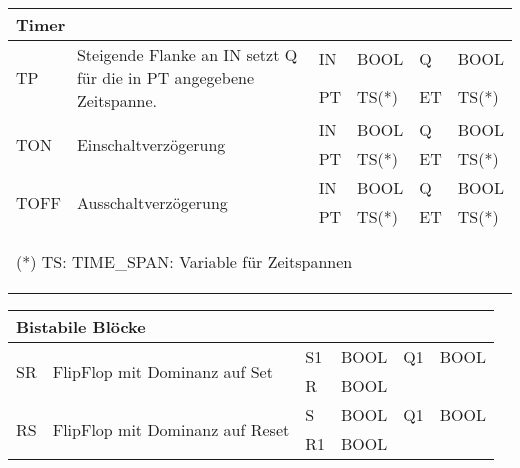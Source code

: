 {\begin{table}
\begin{tabular}{|m{2cm}|m{7cm}|>{\raggedright}m{0.75cm} >{\raggedleft}m{1cm}|>{\raggedright}m{0.75cm} >{\raggedleft\arraybackslash}m{1cm}|}
\multicolumn{6}{|l|}{\textbf{Timer}}\\
\hline
\multirow{2}{*}{TP}&\multirow{2}{7cm}{Steigende Flanke an IN setzt Q für die in PT angegebene Zeitspanne.}& IN & BOOL & Q & BOOL\\
 & &PT & TS(*) & ET & TS(*)\\
\hline
\multirow{2}{*}{TON}&\multirow{2}{7cm}{Einschaltverzögerung}& IN & BOOL & Q & BOOL\\
 & &PT & TS(*) & ET & TS(*)\\
\hline
\multirow{2}{*}{TOFF}&\multirow{2}{7cm}{Ausschaltverzögerung}& IN & BOOL & Q & BOOL\\
 & &PT & TS(*) & ET & TS(*)\\
\hline
\multicolumn{6}{l}{
\begin{footnotesize}
(*) TS: TIME\_SPAN: Variable für Zeitspannen
\end{footnotesize}}
\end{tabular}
\renewcommand{\arraystretch}{1}
\end{table}
\begin{table}
\centering
\renewcommand{\arraystretch}{1.2}
\begin{tabular}{|m{2cm}|m{7cm}|>{\raggedright}m{0.5cm} >{\raggedleft}m{1.25cm}|>{\raggedright}m{0.5cm} >{\raggedleft\arraybackslash}m{1.25cm}|}
\hline

\multicolumn{6}{|l|}{\textbf{Bistabile Blöcke}}\\
\hline
\multirow{2}{*}{SR}&\multirow{2}{7cm}{FlipFlop mit Dominanz auf Set}& S1 & BOOL & Q1 & BOOL\\
 & &R & BOOL & &\\
\hline
\multirow{2}{*}{RS}&\multirow{2}{7cm}{FlipFlop mit Dominanz auf Reset}& S & BOOL & Q1 & BOOL\\
 & &R1 & BOOL & &\\
\hline


\end{tabular}
\end{table}}
